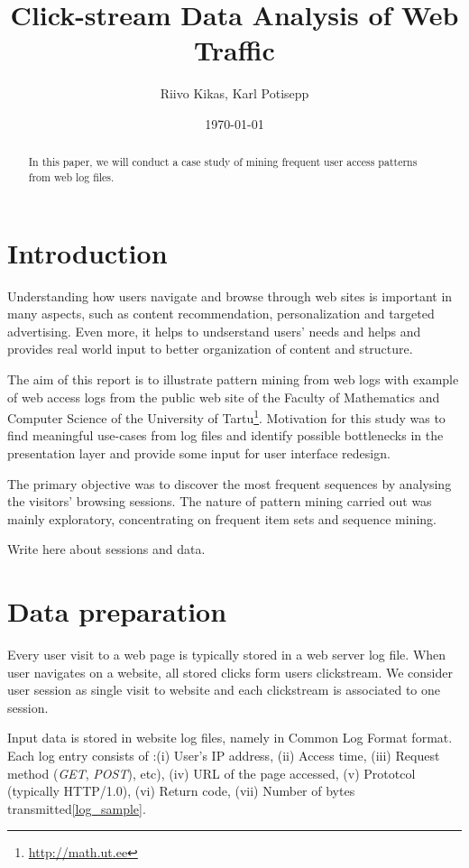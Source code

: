 \documentclass[english,a4paper]{article}
\begin{document}
\title{Click-stream Data Analysis of Web Traffic}
\author{Riivo Kikas, Karl Potisepp}
\date{\today}
\maketitle

\begin{abstract}
In this paper, we will conduct a case study of mining frequent user access patterns from web log files.
\end{abstract}

\section{Introduction} 
Understanding how users navigate and browse through web sites is important in many aspects, such as content recommendation,
personalization and targeted advertising. Even more, it helps to undserstand users' needs and helps and provides real world input to better organization of content and structure.

The aim of this report is to illustrate pattern mining from web logs with example of web access logs from the public web site of the Faculty of Mathematics and Computer Science of the University of Tartu\footnote{\url{http://math.ut.ee}}. Motivation for this study was to find meaningful use-cases from log files and identify possible bottlenecks in the presentation layer and provide some input for user interface redesign. 

The primary objective was to discover the most frequent sequences by analysing the visitors' browsing sessions. The nature of pattern mining carried out was mainly exploratory, concentrating on frequent item sets and sequence mining.

Write here about sessions and data.

\section{Data preparation} 
Every user visit to a web page is typically stored in a web server log file. When user navigates on a website, all stored clicks form users clickstream. We consider user session as single visit to website and each clickstream is associated to one session.

Input data is stored in website log files, namely in Common Log Format\cite{ref_clf} format. Each log entry consists of :(i) User's IP address, (ii) Access time, (iii) Request method (\emph{GET}, \emph{POST}), etc), (iv) URL of the page accessed, (v) Prototcol (typically HTTP/1.0), (vi) Return code, (vii) Number of bytes transmitted\ref{log_sample}.
\end{document}
